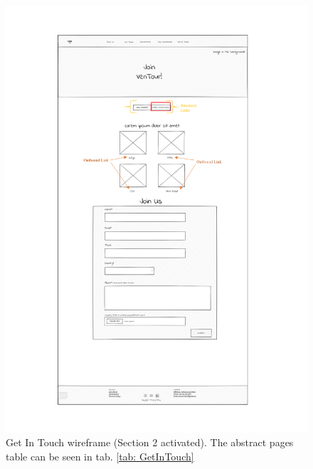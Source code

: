  \begin{figure}[!htb]
     \centering
     \includegraphics[width=\textwidth]{Images/Wireframes/JoinUS-1.png}
     \caption{Get In Touch wireframe (Section 2 activated). The abstract pages table can be seen in tab. \ref{tab: GetInTouch}}
     \label{fig:getintouch-wireframe1}
 \end{figure}
 
